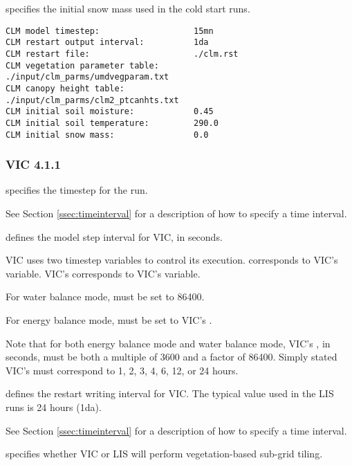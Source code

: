   specifies the initial snow mass used
 in the cold start runs.
 

 \begin{Verbatim}[frame=single]
CLM model timestep:                   15mn
CLM restart output interval:          1da
CLM restart file:                     ./clm.rst
CLM vegetation parameter table:       ./input/clm_parms/umdvegparam.txt
CLM canopy height table:              ./input/clm_parms/clm2_ptcanhts.txt
CLM initial soil moisture:            0.45
CLM initial soil temperature:         290.0
CLM initial snow mass:                0.0
 \end{Verbatim}

 
 \subsubsection{VIC 4.1.1} \label{sssec:lsm_vic411}
 

 
  specifies the timestep for the run.

 See Section \ref{ssec:timeinterval} for a description
 of how to specify a time interval.

  defines the model step interval
 for VIC, in seconds.

 VIC uses two timestep variables to control its execution.
  corresponds to VIC's
  variable.  VIC's 
 corresponds to VIC's  variable.

 For water balance mode, 
 must be set to 86400.

 For energy balance mode, 
 must be set to VIC's .

 Note that for both energy balance mode and water balance mode,
 VIC's , in seconds, must be both a
 multiple of 3600 and a factor of 86400.
 Simply stated VIC's  must
 correspond to 1, 2, 3, 4, 6, 12, or 24 hours.

  defines the restart
 writing interval for VIC. The typical value used in the
 LIS runs is 24 hours (1da).

 See Section \ref{ssec:timeinterval} for a description
 of how to specify a time interval.

  specifies whether VIC or LIS
 will perform vegetation-based sub-grid tiling.


